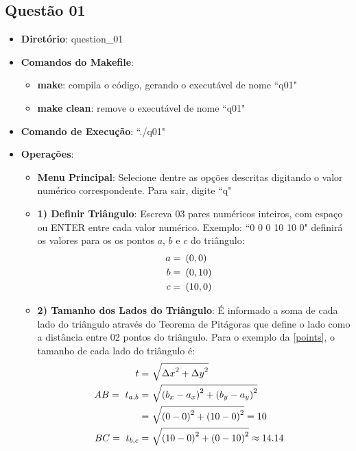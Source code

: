 	\subsection{Questão 01}
			\begin{itemize}
				\item{\textbf{Diretório}: question\_01}
				\item{\textbf{Comandos do Makefile}:
				\begin{itemize}
					\item{\textbf{make}: compila o código, gerando o executável de nome ``q01"}
					\item{\textbf{make clean}: remove o executável de nome ``q01"}
				\end{itemize}}
				\item{\textbf{Comando de Execução}: ``./q01"}
				\item{\textbf{Operações}:
				\begin{itemize}
					\item{\textbf{Menu Principal}: Selecione dentre as opções descritas digitando o valor numérico correspondente. Para sair, digite ``q"}
					\item{\textbf{1) Definir Triângulo}: Escreva 03 pares numéricos inteiros, com espaço ou ENTER entre cada valor numérico. Exemplo: ``0 0 0 10 10 0" definirá os valores para os os pontos $a$, $b$ e $c$ do triângulo:
					\begin{align}
						a = \ &\left(0, 0\right)& \notag \\
						b = \ &\left(0, 10\right)& \notag \\
						c = \ &\left(10, 0\right)& \label{points}
					\end{align}
					}
					\item{\textbf{2) Tamanho dos Lados do Triângulo}: É informado a soma de cada lado do triângulo através do Teorema de Pitágoras que define o lado como a distância entre 02 pontos do triângulo. Para o exemplo da \cref{points}, o tamanho de cada lado do triângulo é:
					\begin{align}
						t = \ &\sqrt{{\Delta x}^{2} + {\Delta y}^{2}}& \notag \\
						AB = \ t_{a,b} = \ &\sqrt{\left(b_{x} - a_{x} \right)^{2} + \left(b_{y} - a_{y} \right)^{2}}& \notag \\
						= \ &\sqrt{\left(0 - 0 \right)^{2} + \left(10 - 0 \right)^{2}} = 10& \notag \\
						BC = \ t_{b,c} = \ &\sqrt{\left(10 - 0 \right)^{2} + \left(0 - 10 \right)^{2}} \approx 14.14& \notag \\

\end{align}}
\end{itemize}}
\end{itemize}

